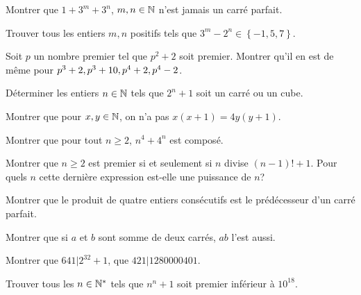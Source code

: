 		\begin{exo}
				Montrer que $1+3^m+3^n$, $m,n \in \mathbb{N}$ n'est jamais un carré parfait.
		\end{exo}

		\begin{exo}
				Trouver tous les entiers $m,n$ positifs tels que $3^m-2^n \in \left\{-1, 5, 7\right\}$.
		\end{exo}

		\begin{exo}
				Soit $p$ un nombre premier tel que $p^2+2$ soit premier. Montrer qu'il en est de même pour $p^3+2,\\ p^3+10, p^4+2, p^4-2$. 
		\end{exo}

		\begin{exo}
				Déterminer les entiers $n \in \mathbb{N}$ tels que $2^n+1$ soit un carré ou un cube.
		\end{exo}

		\begin{exo}
				Montrer que pour $x,y \in \mathbb{N}$, on n'a pas $x(x+1)=4y(y+1)$.
		\end{exo}

		\begin{exo}
				Montrer que pour tout $n \geq 2$, $n^4+4^n$ est composé. 
		\end{exo}

		\begin{exo}
				Montrer que $n \geq 2$ est premier si et seulement si $n$ divise $(n-1)!+1$. Pour quels $n$ cette dernière expression est-elle une puissance de $n$?
		\end{exo}

		\begin{exo}
				Montrer que le produit de quatre entiers consécutifs est le prédécesseur d'un carré parfait.
		\end{exo}

		\begin{exo}
				Montrer que si $a$ et $b$ sont somme de deux carrés, $ab$ l'est aussi. 
		\end{exo}

		\begin{exo}
				Montrer que $641|2^{32}+1$, que $421|1280000401$. 
		\end{exo}

		\begin{exo}
				Trouver tous les $n\in \mathbb{N}^*$ tels que $n^n+1$ soit premier inférieur à $10^{18}$. 
		\end{exo}

